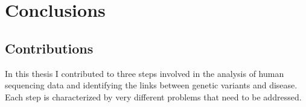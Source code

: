 
\chapter{Conclusions \label{ch:concl}}

\section{Contributions}

In this thesis I contributed to three steps involved in the analysis of human sequencing data and identifying the links between genetic variants and disease. Each step is characterized by very different problems that need to be addressed.
					
